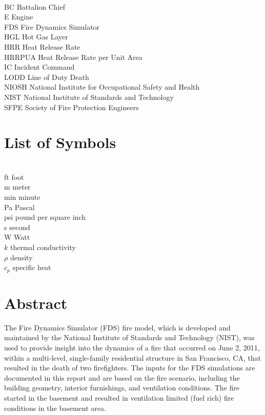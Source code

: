 \documentclass[12pt,oneside]{book}
\begin{document}
\begin{tabbing}
\hspace{1.5in} \= \\
BC \> Battalion Chief \\
E \> Engine \\
FDS \> Fire Dynamics Simulator \\
HGL \> Hot Gas Layer \\
HRR \> Heat Release Rate \\
HRRPUA \> Heat Release Rate per Unit Area \\
IC \> Incident Command \\
LODD \> Line of Duty Death \\
NIOSH \> National Institute for Occupational Safety and Health \\
NIST \> National Institute of Standards and Technology \\
SFPE \> Society of Fire Protection Engineers \\
\end{tabbing}

\chapter{List of Symbols}

\begin{tabbing}
\hspace{1.5in} \= \\
ft \> foot \\
m \> meter \\
min \> minute \\
Pa \> Pascal \\
psi \> pound per square inch \\
s \> second \\
W \> Watt \\
$k$ \> thermal conductivity \\
$\rho$ \> density \\
$c_{p}$ \> specific heat \\
\end{tabbing}

\mainmatter


\chapter*{\centering Abstract}

The Fire Dynamics Simulator (FDS) fire model, which is developed and maintained by the National Institute of Standards and Technology (NIST), was used to provide insight into the dynamics of a fire that occurred on June 2, 2011, within a multi-level, single-family residential structure in San Francisco, CA, that resulted in the death of two firefighters. The inputs for the FDS simulations are documented in this report and are based on the fire scenario, including the building geometry, interior furnishings, and ventilation conditions. The fire started in the basement and resulted in ventilation limited (fuel rich) fire conditions in the basement area.
\end{document}
